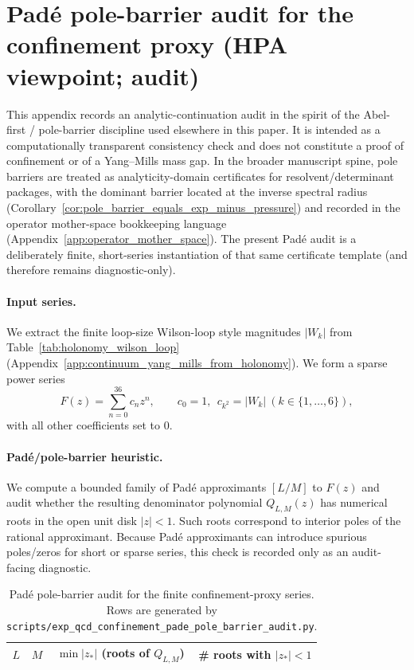 \section{Padé pole-barrier audit for the confinement proxy (HPA viewpoint; audit)}
\label{app:qcd_confinement_pade_pole_barrier_audit}

This appendix records an \AuditTag{} analytic-continuation audit in the spirit of the Abel-first / pole-barrier discipline used elsewhere in this paper.
It is intended as a computationally transparent consistency check and does not constitute a proof of confinement or of a Yang--Mills mass gap.
\AuditTag In the broader manuscript spine, pole barriers are treated as analyticity-domain certificates for resolvent/determinant packages, with the dominant barrier located at the inverse spectral radius (Corollary~\ref{cor:pole_barrier_equals_exp_minus_pressure}) and recorded in the operator mother-space bookkeeping language (Appendix~\ref{app:operator_mother_space}).
The present Pad\'e audit is a deliberately finite, short-series instantiation of that same certificate template (and therefore remains diagnostic-only).

\paragraph{Input series.}
We extract the finite loop-size Wilson-loop style magnitudes $|W_k|$ from Table~\ref{tab:holonomy_wilson_loop} (Appendix~\ref{app:continuum_yang_mills_from_holonomy}).
We form a sparse power series
\[
F(z)=\sum_{n=0}^{36} c_n z^n,
\qquad
c_0=1,\ \ c_{k^2}=|W_k|\ (k\in\{1,\dots,6\}),
\]
with all other coefficients set to $0$.

\paragraph{Padé/pole-barrier heuristic.}
\AuditTag We compute a bounded family of Padé approximants $[L/M]$ to $F(z)$ and audit whether the resulting denominator polynomial $Q_{L,M}(z)$ has numerical roots in the open unit disk $|z|<1$.
Such roots correspond to interior poles of the rational approximant.
Because Padé approximants can introduce spurious poles/zeros for short or sparse series, this check is recorded only as an audit-facing diagnostic.

%

\begin{table}[t]
\centering
\scriptsize
\setlength{\tabcolsep}{10pt}
\renewcommand{\arraystretch}{1.15}
\begin{tabular}{rrrr}
\toprule
$L$ & $M$ & $\min|z_\ast|$ (roots of $Q_{L,M}$) & \# roots with $|z_\ast|<1$ \\
\midrule
%
\end{tabular}
\caption{Padé pole-barrier audit for the finite confinement-proxy series. Rows are generated by \texttt{scripts/exp\_qcd\_confinement\_pade\_pole\_barrier\_audit.py}.}
\label{tab:qcd_confinement_pade_pole_barrier_audit}
\end{table}

